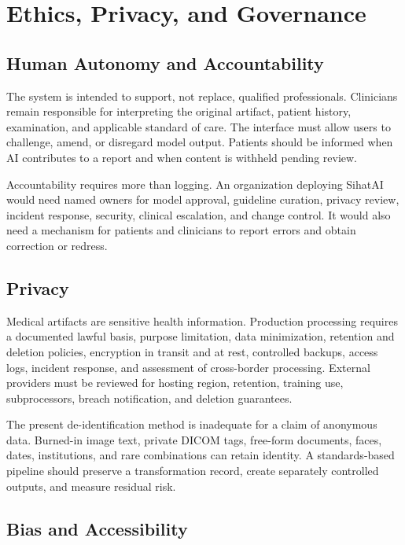 \documentclass[conference]{IEEEtran}
\begin{document}
\section{Ethics, Privacy, and Governance}

\subsection{Human Autonomy and Accountability}

The system is intended to support, not replace, qualified professionals. Clinicians remain responsible for interpreting the original artifact, patient history, examination, and applicable standard of care. The interface must allow users to challenge, amend, or disregard model output. Patients should be informed when AI contributes to a report and when content is withheld pending review.

Accountability requires more than logging. An organization deploying SihatAI would need named owners for model approval, guideline curation, privacy review, incident response, security, clinical escalation, and change control. It would also need a mechanism for patients and clinicians to report errors and obtain correction or redress.

\subsection{Privacy}

Medical artifacts are sensitive health information. Production processing requires a documented lawful basis, purpose limitation, data minimization, retention and deletion policies, encryption in transit and at rest, controlled backups, access logs, incident response, and assessment of cross-border processing. External providers must be reviewed for hosting region, retention, training use, subprocessors, breach notification, and deletion guarantees.

The present de-identification method is inadequate for a claim of anonymous data. Burned-in image text, private DICOM tags, free-form documents, faces, dates, institutions, and rare combinations can retain identity. A standards-based pipeline should preserve a transformation record, create separately controlled outputs, and measure residual risk.

\subsection{Bias and Accessibility}
\end{document}
